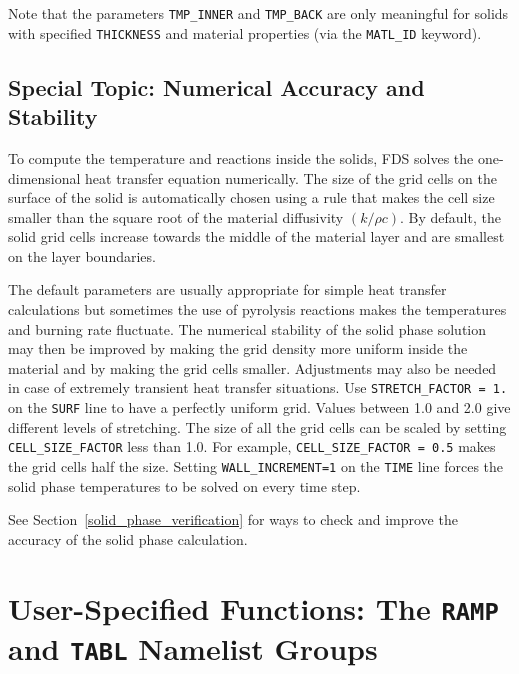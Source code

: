 \documentclass[11pt]{book}
\newcommand{\ct}{\tt\small}
\begin{document}
\begin{warning}
\noindent
Note that the parameters {\ct TMP\_INNER} and {\ct TMP\_BACK} are only meaningful for solids with specified {\ct THICKNESS} and material
properties (via the {\ct MATL\_ID} keyword).
\end{warning}

\subsection{Special Topic: Numerical Accuracy and Stability}

To compute the temperature and reactions inside the solids, FDS solves
the one-dimensional heat transfer equation numerically. The size of
the grid cells on the surface of the solid is automatically chosen
using a rule that makes the cell size smaller than the square root of
the material diffusivity $(k/\rho c)$. By default, the solid grid
cells increase towards the middle of the material layer and are smallest
on the layer boundaries.

The default parameters are usually appropriate for simple heat
transfer calculations but sometimes the use of pyrolysis reactions
makes the temperatures and burning rate fluctuate. The numerical
stability of the solid phase solution may then be improved by making
the grid density more uniform inside the material and by making the
grid cells smaller. Adjustments may also be needed in case of
extremely transient heat transfer situations. Use {\ct STRETCH\_FACTOR
= 1.} on the {\ct SURF} line to have a perfectly uniform grid. Values
between 1.0 and 2.0 give different levels of stretching.  The size of
all the grid cells can be scaled by setting {\ct CELL\_SIZE\_FACTOR}
less than 1.0. For example, {\ct CELL\_SIZE\_FACTOR = 0.5} makes the
grid cells half the size. Setting {\ct WALL\_INCREMENT=1} on the
{\ct TIME} line forces the solid phase temperatures to be solved on every
time step.

See Section~\ref{solid_phase_verification} for ways to check and improve the accuracy of the solid phase calculation.






\clearpage

\section{User-Specified Functions: The \texorpdfstring{{\tt RAMP}}{RAMP} and \texorpdfstring{{\tt TABL}}{TABL} Namelist Groups}
\label{info:RAMP}
\label{info:TABL}
\end{document}

